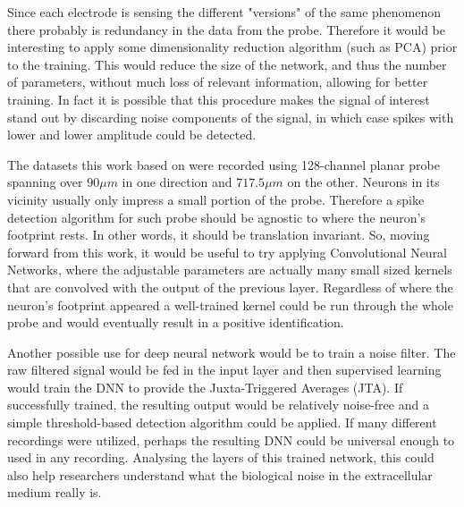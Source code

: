 Since each electrode is sensing the different "versions" of the same phenomenon there probably is redundancy in the data from the probe. Therefore it would be interesting to apply some dimensionality reduction algorithm (such as PCA) prior to the training. This would reduce the size of the network, and thus the number of parameters, without much loss of relevant information, allowing for better training. In fact it is possible that this procedure makes the signal of interest stand out by discarding noise components of the signal, in which case spikes with lower and lower amplitude could be detected.

The datasets this work based on were recorded using 128-channel planar probe spanning over $90 \mu m$ in one direction and $717.5 \mu m$ on the other. Neurons in its vicinity usually only impress a small portion of the probe. Therefore a spike detection algorithm for such probe should be agnostic to where the neuron's footprint rests. In other words, it should be translation invariant. So, moving forward from this work,  it would be useful to try applying Convolutional Neural Networks, where the adjustable parameters are actually many small sized kernels that are convolved with the output of the previous layer. Regardless of where the neuron's footprint appeared a well-trained kernel could be run through the whole probe and would eventually result in a positive identification.

Another possible use for deep neural network would be to train a noise filter. The raw filtered signal would be fed in the input layer and then supervised learning would train the DNN to provide the Juxta-Triggered Averages (JTA). If successfully trained, the resulting output would be relatively noise-free and a simple threshold-based detection algorithm could be applied. If many different recordings were utilized, perhaps the resulting DNN could be universal enough to used in any recording.
Analysing the layers of this trained network, this could also help researchers understand what the biological noise in the extracellular medium really is.

\cleardoublepage
